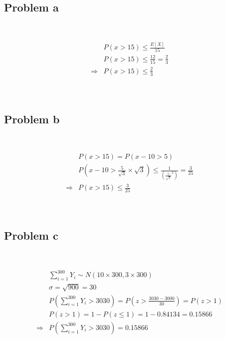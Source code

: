 \documentclass{article}
\begin{document}
\subsection*{Problem a}

~

\begin{align*}
    &P(x>15)\leqslant \frac{E[X]}{15}\\
    &P(x>15)\leqslant\frac{12}{15}=\frac{2}{3}\\
    \Rightarrow&P(x>15)\leqslant\frac{2}{3}\\
\end{align*}

~

\subsection*{Problem b}

~

\begin{align*}
    &P(x>15)=P(x-10>5)\\
    &P(x-10>\frac{5}{\sqrt{3}}\times \sqrt{3})\leqslant\frac{1}{(\frac{5}{\sqrt{3}}^2)}=\frac{3}{25}\\
    \Rightarrow&P(x>15)\leqslant\frac{3}{25}\\
\end{align*}

~

\subsection*{Problem c}

~

\begin{align*}
    &\sum_{i=1}^{300}Y_i\sim N(10\times 300,3\times 300)\\
    &\sigma=\sqrt{900}=30\\
    &P(\sum_{i=1}^{300}Y_i>3030)=P(z>\frac{3030-3000}{30})=P(z>1)\\
    &P(z>1)=1-P(z\leqslant1)=1-0.84134=0.15866\\
    \Rightarrow&P(\sum_{i=1}^{300}Y_i>3030)=0.15866\\
\end{align*}
\end{document}
